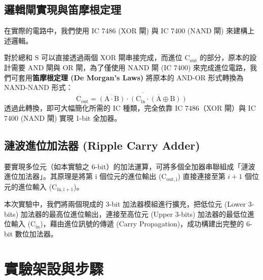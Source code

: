 \documentclass[12pt]{article}
\begin{document}
\subsection{邏輯閘實現與笛摩根定理}
在實際的電路中，我們使用 IC 7486 (XOR 閘) 與 IC 7400 (NAND 閘) 來建構上述邏輯。

對於總和 $\mathrm{S}$ 可以直接透過兩個 XOR 閘串接完成，而進位 $\mathrm{C_{out}}$ 的部分，原本的設計需要 AND 閘與 OR 閘，為了僅使用 NAND 閘 (IC 7400) 來完成進位電路，我們可套用\textbf{笛摩根定理 (De Morgan's Laws)} 將原本的 AND-OR 形式轉換為 NAND-NAND 形式：
\begin{equation}
   \mathrm{C_{out} = \overline{ \overline{(A \cdot B)} \cdot \overline{(C_{in} \cdot (A \oplus B))} }}
\end{equation}
透過此轉換，即可大幅簡化所需的 IC 種類，完全依靠 IC 7486（XOR 閘）與 IC 7400 (NAND 閘) 實現 1-bit 全加器。

\subsection{漣波進位加法器 (Ripple Carry Adder)}
要實現多位元（如本實驗之 6-bit）的加法運算，可將多個全加器串聯組成「漣波進位加法器」。其原理是將第 $\mathrm{i}$ 個位元的進位輸出 ($\mathrm{C_{out, i}}$) 直接連接至第 $i+1$ 個位元的進位輸入 ($\mathrm{C_{in, i+1}}$)。

本次實驗中，我們將兩個現成的 3-bit 加法器模組進行擴充，把低位元 (Lower 3-bits) 加法器的最高位進位輸出，連接至高位元 (Upper 3-bits) 加法器的最低位進位輸入 ($\mathrm{C_{in}}$)，藉由進位訊號的傳遞 (Carry Propagation)，成功構建出完整的 6-bit 數位加法器。

\section{實驗架設與步驟}
\end{document}
